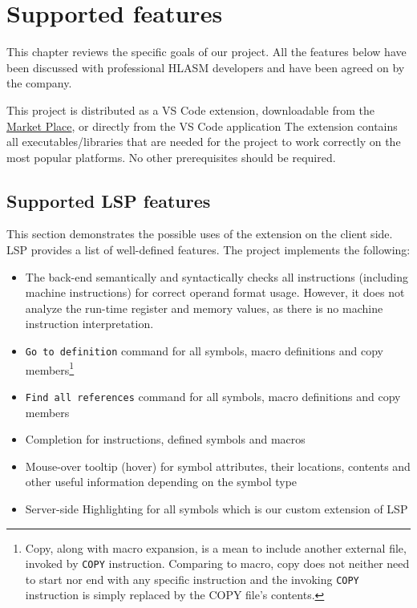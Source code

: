 \chapter{Supported features}

This chapter reviews the specific goals of our project.
All the features below have been discussed with professional HLASM developers and have been agreed on by the company.

This project is distributed as a VS Code extension, downloadable from the  \href{https://marketplace.visualstudio.com/}{Market Place}, or directly from the VS Code application The extension contains all executables/libraries that are needed for the project to work correctly on the most popular platforms. No other prerequisites should be required.

\section{Supported LSP features}
This section demonstrates the possible uses of the extension on the client side. LSP provides a list of well-defined features. The project implements the following:

\begin{itemize}
	\item The back-end semantically and syntactically checks all instructions (including machine instructions) for correct operand format usage. However, it does not analyze the run-time register and memory values, as there is no machine instruction interpretation.
	\item \texttt{Go to definition} command for all symbols, macro definitions and copy members\footnote{Copy, along with macro expansion, is a mean to include another external file, invoked by \texttt{COPY} instruction. Comparing to macro, copy does not neither need to start nor end with any specific instruction and the invoking \texttt{COPY} instruction is simply replaced by the COPY file's contents.}
	\item \texttt{Find all references} command for all symbols, macro definitions and copy members
	\item Completion for instructions, defined symbols and macros
	\item Mouse-over tooltip (hover) for symbol attributes, their locations, contents and other useful information depending on the symbol type

	\item Server-side Highlighting for all symbols which is our custom extension of LSP  
\end{itemize}

